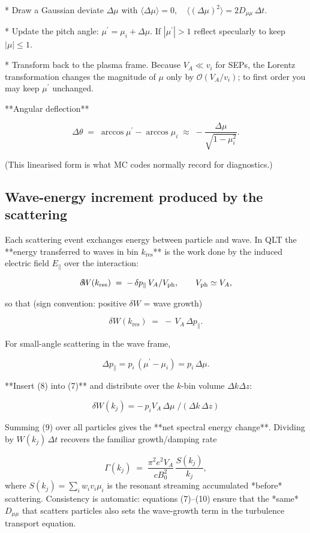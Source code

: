 * Draw a Gaussian deviate $\Delta \mu$ with
  $\displaystyle \langle\Delta \mu\rangle=0,\quad
  \langle(\Delta \mu)^{2}\rangle = 2D_{\mu\mu}\,\Delta t.$

* Update the pitch angle: $\mu^{\prime}=\mu_i+\Delta \mu$.
  If $|\mu^{\prime}|>1$ reflect specularly to keep $|\mu|\le1$.

* Transform back to the plasma frame.
  Because $V_A\ll v_i$ for SEPs, the Lorentz transformation changes the magnitude of $\mu$ only by $\mathcal O(V_A/v_i)$; to first order you may keep $\mu^{\prime}$ unchanged.

**Angular deflection**

$$
\Delta\theta \;=\;\arccos μ^{\prime}-\arccos μ_i
\;\approx\;
-\frac{\Delta μ}{\sqrt{1-μ_i^{2}}}.
\tag{5}
$$

(This linearised form is what MC codes normally record for diagnostics.)

\subsection{Wave-energy increment produced by the scattering}

Each scattering event exchanges energy between particle and wave.
In QLT the **energy transferred to waves in bin $k_{\text{res}}$** is the work done by the induced electric field $E_\parallel$ over the interaction:

$$
\delta\!W(k_{\text{res}}) \;=\;
-\,\delta p_{\parallel}\,V_A/V_{\rm ph},
\qquad V_{\rm ph}\simeq V_A ,
$$

so that (sign convention: positive $\delta W$ = wave growth)

$$
\delta W(k_{\text{res}})\;=\;
-\,V_A\,\Delta p_{\parallel}.
$$

For small-angle scattering in the wave frame,

$$
\Delta p_{\parallel}=p_i\,(\mu^{\prime}-\mu_i)=p_i\,\Delta \mu .
$$

**Insert (8) into (7)** and distribute over the $k$-bin volume $\Delta k\Delta z$:

$$
\boxed{\;
\delta W(k_j)
= -\,p_i V_A \,\Delta μ \;
\bigl/(\Delta k\,\Delta z)\;}
$$

Summing (9) over all particles gives the **net spectral energy change**.
Dividing by $W(k_j)\,\Delta t$ recovers the familiar growth/damping rate

$$
\Gamma(k_j)\;=\;\frac{\pi^{2}e^{2}V_A}{cB_0^{2}}\,
\frac{S(k_j)}{k_j},
$$
where $S(k_j)=\sum_i w_i v_i \mu_i$ is the resonant streaming accumulated *before* scattering.
Consistency is automatic: equations (7)–(10) ensure that the *same* $D_{\mu\mu}$ that scatters particles also sets the wave-growth term in the turbulence transport equation.

